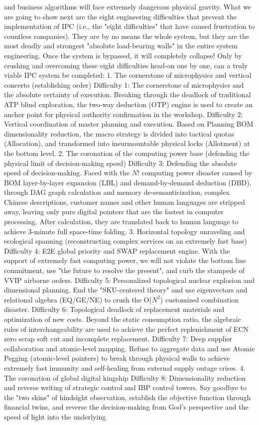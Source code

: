 \documentclass[11pt,a4paper]{article}
\begin{document}
and business algorithms will face extremely dangerous physical gravity. What we are going to show next are the eight engineering difficulties that prevent the implementation of IPC (i.e., the "eight difficulties" that have caused frustration to countless companies). They are by no means the whole system, but they are the most deadly and strongest "absolute load-bearing walls" in the entire system engineering. Once the system is bypassed, it will completely collapse! Only by crushing and overcoming these eight difficulties head-on one by one, can a truly viable IPC system be completed: 1. The cornerstone of microphysics and vertical concerto (establishing order) Difficulty 1: The cornerstone of microphysics and the absolute certainty of execution. Breaking through the deadlock of traditional ATP blind exploration, the two-way deduction (OTP) engine is used to create an anchor point for physical authority confirmation in the workshop. Difficulty 2: Vertical coordination of master planning and execution. Based on Planning BOM dimensionality reduction, the macro strategy is divided into tactical quotas (Allocation), and transformed into insurmountable physical locks (Allotment) at the bottom level. 2. The coronation of the computing power base (defending the physical limit of decision-making speed) Difficulty 3: Defending the absolute speed of decision-making. Faced with the $N!$ computing power disaster caused by BOM layer-by-layer expansion (LBL) and demand-by-demand deduction (DBD), through DAG graph calculation and memory de-semanticization, complex Chinese descriptions, customer names and other human languages are stripped away, leaving only pure digital pointers that are the fastest in computer processing. After calculation, they are translated back to human language to achieve 3-minute full space-time folding. 3. Horizontal topology unraveling and ecological spanning (reconstructing complex services on an extremely fast base) Difficulty 4: E2E global priority and SWAP replacement engine. With the support of extremely fast computing power, we will not violate the bottom line commitment, use "the future to resolve the present", and curb the stampede of VVIP airborne orders. Difficulty 5: Personalized topological nuclear explosion and dimensional planning. End the "SKU-centered theory" and use eigenvectors and relational algebra (EQ/GE/NE) to crush the O($N^2$) customized combination disaster. Difficulty 6: Topological deadlock of replacement materials and optimization of new costs. Beyond the static consumption ratio, the algebraic rules of interchangeability are used to achieve the perfect replenishment of ECN zero scrap soft cut and incomplete replacement. Difficulty 7: Deep supplier collaboration and atomic-level mapping. Refuse to aggregate data and use Atomic Pegging (atomic-level pointers) to break through physical walls to achieve extremely fast immunity and self-healing from external supply outage crises. 4. The coronation of global digital kingship Difficulty 8: Dimensionality reduction and reverse writing of strategic control and IBP control towers. Say goodbye to the "two skins" of hindsight observation, establish the objective function through financial twins, and reverse the decision-making from God's perspective and the speed of light into the underlying 
\end{document}
